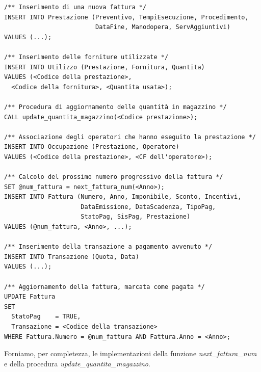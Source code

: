         \begin{lstlisting}
/** Inserimento di una nuova fattura */
INSERT INTO Prestazione (Preventivo, TempiEsecuzione, Procedimento,
                         DataFine, Manodopera, ServAggiuntivi)
VALUES (...);

/** Inserimento delle forniture utilizzate */
INSERT INTO Utilizzo (Prestazione, Fornitura, Quantita)
VALUES (<Codice della prestazione>, 
  <Codice della fornitura>, <Quantita usata>);

/** Procedura di aggiornamento delle quantità in magazzino */
CALL update_quantita_magazzino(<Codice prestazione>);

/** Associazione degli operatori che hanno eseguito la prestazione */
INSERT INTO Occupazione (Prestazione, Operatore)
VALUES (<Codice della prestazione>, <CF dell'operatore>);

/** Calcolo del prossimo numero progressivo della fattura */
SET @num_fattura = next_fattura_num(<Anno>);
INSERT INTO Fattura (Numero, Anno, Imponibile, Sconto, Incentivi,
                     DataEmissione, DataScadenza, TipoPag,
                     StatoPag, SisPag, Prestazione)
VALUES (@num_fattura, <Anno>, ...);

/** Inserimento della transazione a pagamento avvenuto */
INSERT INTO Transazione (Quota, Data)
VALUES (...);

/** Aggiornamento della fattura, marcata come pagata */
UPDATE Fattura
SET
  StatoPag    = TRUE,
  Transazione = <Codice della transazione>
WHERE Fattura.Numero = @num_fattura AND Fattura.Anno = <Anno>;
        \end{lstlisting}

        Forniamo, per completezza, le implementazioni della funzione \emph{next\_fattura\_num} e della procedura \emph{update\_quantita\_magazzino}.

